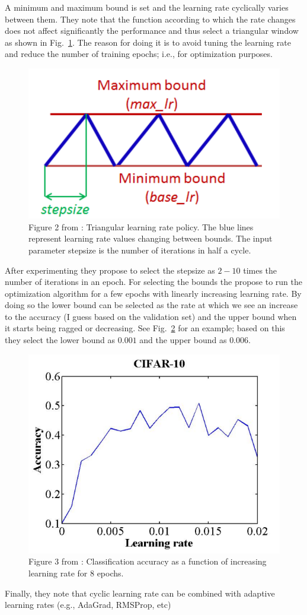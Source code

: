 A minimum and maximum bound is set and the learning rate cyclically varies between them.
They note that the function according to which the rate changes does not affect significantly the performance and thus select a triangular window as shown in Fig.~\ref{triang}.
The reason for doing it is to avoid tuning the learning rate and reduce the number of training epochs; i.e., for optimization purposes.
\begin{figure}[H]
	\centering
	\includegraphics[width=0.5\linewidth]{./Figures/triang.png}
	\caption{Figure 2 from \textcite{smith2017cyclical}: Triangular learning rate policy. The blue lines represent learning rate values changing between bounds. The input parameter stepsize is the number of iterations in half a cycle.}
	\label{triang}
\end{figure}
After experimenting they propose to select the stepsize as $2-10$ times the number of iterations in an epoch.
For selecting the bounds the propose to run the optimization algorithm for a few epochs with linearly increasing learning rate.
By doing so the lower bound can be selected as the rate at which we see an increase to the accuracy (I guess based on the validation set) and the upper bound when it starts being ragged or decreasing. 
See Fig.~\ref{selectbounds} for an example; based on this they select the lower bound as $0.001$ and the upper bound as $0.006$.
\begin{figure}[H]
	\centering
	\includegraphics[width=0.5\linewidth]{./Figures/selectbounds.png}
	\caption{Figure 3 from \textcite{smith2017cyclical}: Classification accuracy as a function of increasing learning rate for 8 epochs.}
	\label{selectbounds}
\end{figure}
Finally, they note that cyclic learning rate can be combined with adaptive learning rates (e.g., AdaGrad, RMSProp, etc)

